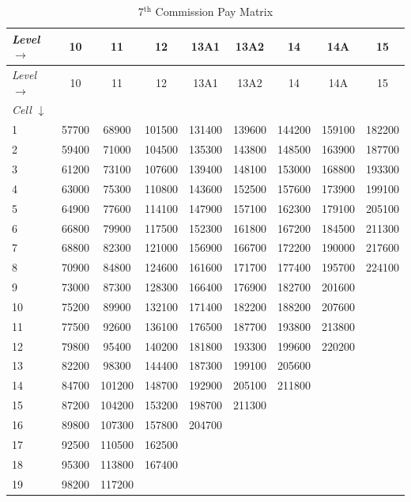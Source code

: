 \documentclass[
  10pt,
  a5paper,
  10pt,
  openany]{amsbook}
\begin{document}
\begin{longtable}[]{@{}lcccccccc@{}}
\caption{7\(^{\text{th}}\) Commission Pay Matrix}\tabularnewline
\toprule\noalign{}
\emph{Level \(\rightarrow\)} & 10 & 11 & 12 & 13A1 & 13A2 & 14 & 14A &
15 \\
\midrule\noalign{}
\endfirsthead
\toprule\noalign{}
\emph{Level \(\rightarrow\)} & 10 & 11 & 12 & 13A1 & 13A2 & 14 & 14A &
15 \\
\midrule\noalign{}
\endhead
\bottomrule\noalign{}
\endlastfoot
\emph{Cell \(\downarrow\)} & & & & & & & & \\
1 & 57700 & 68900 & 101500 & 131400 & 139600 & 144200 & 159100 &
182200 \\
2 & 59400 & 71000 & 104500 & 135300 & 143800 & 148500 & 163900 &
187700 \\
3 & 61200 & 73100 & 107600 & 139400 & 148100 & 153000 & 168800 &
193300 \\
4 & 63000 & 75300 & 110800 & 143600 & 152500 & 157600 & 173900 &
199100 \\
5 & 64900 & 77600 & 114100 & 147900 & 157100 & 162300 & 179100 &
205100 \\
6 & 66800 & 79900 & 117500 & 152300 & 161800 & 167200 & 184500 &
211300 \\
7 & 68800 & 82300 & 121000 & 156900 & 166700 & 172200 & 190000 &
217600 \\
8 & 70900 & 84800 & 124600 & 161600 & 171700 & 177400 & 195700 &
224100 \\
9 & 73000 & 87300 & 128300 & 166400 & 176900 & 182700 & 201600 & \\
10 & 75200 & 89900 & 132100 & 171400 & 182200 & 188200 & 207600 & \\
11 & 77500 & 92600 & 136100 & 176500 & 187700 & 193800 & 213800 & \\
12 & 79800 & 95400 & 140200 & 181800 & 193300 & 199600 & 220200 & \\
13 & 82200 & 98300 & 144400 & 187300 & 199100 & 205600 & & \\
14 & 84700 & 101200 & 148700 & 192900 & 205100 & 211800 & & \\
15 & 87200 & 104200 & 153200 & 198700 & 211300 & & & \\
16 & 89800 & 107300 & 157800 & 204700 & & & & \\
17 & 92500 & 110500 & 162500 & & & & & \\
18 & 95300 & 113800 & 167400 & & & & & \\
19 & 98200 & 117200 & & & & & & \\
\end{longtable}
\end{document}
